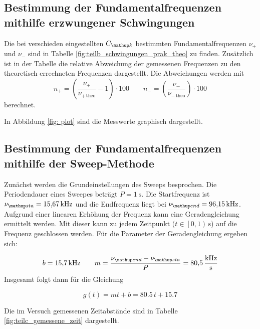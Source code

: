 %


\subsection{Bestimmung der Fundamentalfrequenzen mithilfe erzwungener Schwingungen}
Die bei verschieden eingestellten $C\ua{k}$ bestimmten Fundamentalfrequenzen
$\nu_+$ und $\nu_-$
sind in Tabelle \ref{fig:teilb_schwingungen_prak_theo} zu finden.
Zusätzlich ist in der Tabelle die relative Abweichung der gemessenen Frequenzen
zu den theoretisch errechneten Frequenzen dargestellt.
Die Abweichungen werden mit
\begin{equation}
\label{eq:verh}
n_+=\left(\frac{\nu_+}{\nu_{+\,\mathup{theo}}}-1\right)\cdot 100 \qquad n_-=\left(\frac{\nu_-}{\nu_{-\,\mathup{theo}}}\right)\cdot100
\end{equation}
berechnet.
\FloatBarrier

\FloatBarrier
In Abbildung \ref{fig: plot} sind die Messwerte graphisch dargestellt. %

\subsection{Bestimmung der Fundamentalfrequenzen mithilfe der Sweep-Methode}
Zunächst werden die Grundeinstellungen des Sweeps besprochen.
Die Periodendauer eines Sweepes beträgt $P=\SI{1}{\second}$.
Die Startfrequenz ist $\nu\ua{sta}=\SI{15.67}{\kilo\hertz}$ und die
Endfrequenz liegt bei $\nu\ua{end}=\SI{96.15}{\kilo\hertz}$.
Aufgrund einer linearen Erhöhung der Frequenz kann eine Geradengleichung ermittelt werden.
Mit dieser kann zu jedem Zeitpunkt ($t\in\left[0,1\right)\,\si{\second}$) auf die Frequenz geschlossen werden.
Für die Parameter der Geradengleichung ergeben sich:

\begin{equation*}
b=\SI{15.7}{\kilo\hertz} \qquad m=\frac{\nu\ua{end}-\nu\ua{sta}}{P}=\SI{80.5}{\kilo\hertz\per\second}
\end{equation*}
Insgesamt folgt dann für die Gleichung %

\begin{equation}
\label{eq:geraden}
g(t)=mt+b=80.5\,t+15.7
\end{equation}

Die im Versuch gemessenen Zeitabstände sind in Tabelle \ref{fig:teilc_gemessene_zeit} dargestellt.


